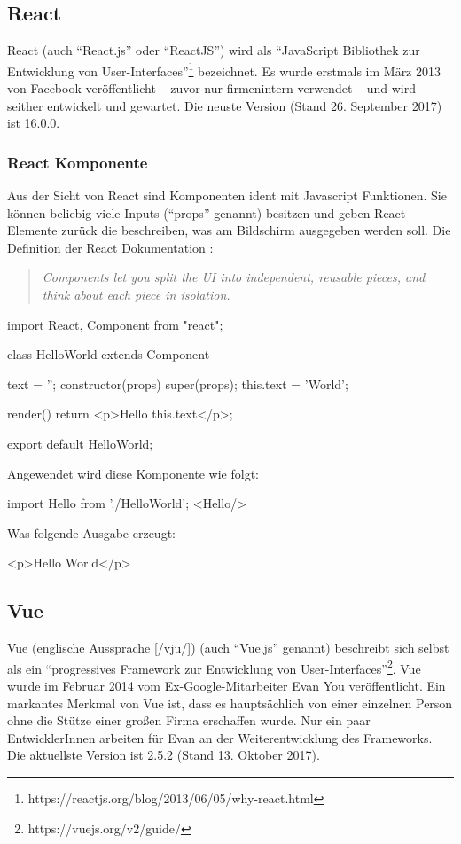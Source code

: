 \subsection{React}
React (auch "`React.js"' oder "`ReactJS"') wird als "`JavaScript Bibliothek zur Entwicklung von User-Interfaces"'\footnote{https://reactjs.org/blog/2013/06/05/why-react.html} bezeichnet. Es wurde erstmals im März 2013 von Facebook veröffentlicht -- zuvor nur firmenintern verwendet -- und wird seither entwickelt und gewartet. Die neuste Version (Stand 26. September 2017) ist 16.0.0.

\subsubsection{React Komponente}
Aus der Sicht von React sind Komponenten ident mit Javascript Funktionen. Sie können beliebig viele Inputs ("`props"' genannt) besitzen und geben React Elemente zurück die beschreiben, was am Bildschirm ausgegeben werden soll.
Die Definition der React Dokumentation \cite{react-component}: 
\begin{quote}
	\begin{english}
		\textit{Components let you split the UI into independent, reusable pieces, and think about each piece in isolation.}
	\end{english}
\end{quote}

\begin{JsCode}
	import React, {Component} from "react";
	
	class HelloWorld extends Component {
		text = '';
		constructor(props) {
			super(props);
			this.text = 'World';
		}
		
		render() {
			return <p>Hello {this.text}</p>;
		}
	}
	export default HelloWorld;
\end{JsCode}

Angewendet wird diese Komponente wie folgt:
\begin{JsCode}[numbers=none]
	import Hello from './HelloWorld';
	<Hello/>
\end{JsCode}
Was folgende Ausgabe erzeugt:
\begin{JsCode}Hello World</p>
\end{JsCode}

\subsection{Vue }
Vue (englische Aussprache [/vju/]) (auch "`Vue.js"' genannt) beschreibt sich selbst als ein "`progressives Framework zur Entwicklung von User-Interfaces"'\footnote{https://vuejs.org/v2/guide/}. Vue wurde im Februar 2014 vom Ex-Google-Mitarbeiter Evan You veröffentlicht. Ein markantes Merkmal von Vue ist, dass es hauptsächlich von einer einzelnen Person ohne die Stütze einer großen Firma erschaffen wurde. Nur ein paar EntwicklerInnen arbeiten für Evan an der Weiterentwicklung des Frameworks. Die aktuellste Version ist 2.5.2 (Stand 13. Oktober 2017).

